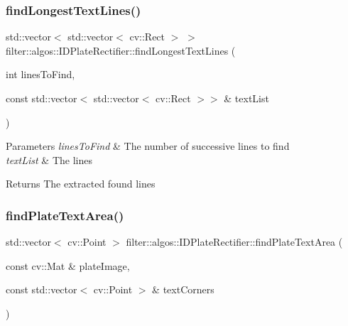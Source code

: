 \subsubsection{\texorpdfstring{find\+Longest\+Text\+Lines()}{findLongestTextLines()}}
{\footnotesize\ttfamily std\+::vector$<$ std\+::vector$<$ cv\+::\+Rect $>$ $>$ filter\+::algos\+::\+I\+D\+Plate\+Rectifier\+::find\+Longest\+Text\+Lines (\begin{DoxyParamCaption}\item[{int}]{lines\+To\+Find,  }\item[{const std\+::vector$<$ std\+::vector$<$ cv\+::\+Rect $>$$>$ \&}]{text\+List }\end{DoxyParamCaption})\hspace{0.3cm}{\ttfamily [private]}}


\begin{DoxyParams}{Parameters}
{\em lines\+To\+Find} & The number of successive lines to find \\
\hline
{\em text\+List} & The lines \\
\hline
\end{DoxyParams}
\begin{DoxyReturn}{Returns}
The extracted found lines 
\end{DoxyReturn}
\mbox{\label{classfilter_1_1algos_1_1_i_d_plate_rectifier_ad7e737a6b3e282191fcfc70277ec4a68}} 
\subsubsection{\texorpdfstring{find\+Plate\+Text\+Area()}{findPlateTextArea()}}
{\footnotesize\ttfamily std\+::vector$<$ cv\+::\+Point $>$ filter\+::algos\+::\+I\+D\+Plate\+Rectifier\+::find\+Plate\+Text\+Area (\begin{DoxyParamCaption}\item[{const cv\+::\+Mat \&}]{plate\+Image,  }\item[{const std\+::vector$<$ cv\+::\+Point $>$ \&}]{text\+Corners }\end{DoxyParamCaption})\hspace{0.3cm}{\ttfamily [private]}}


